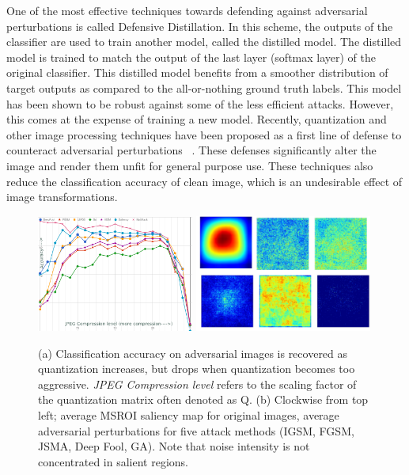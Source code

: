 One of the most effective techniques towards defending against adversarial perturbations is called Defensive Distillation.
In this scheme, the outputs of the classifier are used to train another model, called the distilled model. 
The distilled model is trained to match the output of the last layer (softmax layer) of the original classifier.
This distilled model benefits from a smoother distribution of target outputs as compared to the all-or-nothing ground truth labels.
This model has been shown to be robust against some of the less efficient attacks.
However, this comes at the expense of training a new model.
Recently, quantization and other image processing techniques have been proposed as a first line of defense to counteract adversarial perturbations ~\cite{liang2017detecting,aadityaprakash2018,guo2017countering}. 
These defenses significantly alter the image and render them unfit for general purpose use.
These techniques also reduce the classification accuracy of clean image, which is an undesirable effect of image transformations.

\begin{figure}[H]
    \centering
     \includegraphics[width=0.46\textwidth,angle=0]{figures/protect/jpeg_study.png}
     \includegraphics[width=0.52\textwidth,angle=0]{figures/protect/drawing_noise.jpg}
     \label{fig:jpeg}
     \caption[JPEG under attack]{(a) Classification accuracy on adversarial images is recovered as quantization increases, but drops when quantization becomes too aggressive. \textit{JPEG Compression level} refers to the scaling factor of the quantization matrix often denoted as Q. (b) Clockwise from top left; average MSROI saliency map for original images, average adversarial perturbations for five attack methods (IGSM, FGSM, JSMA, Deep Fool, GA).  Note that noise intensity is not concentrated in salient regions.}
 \end{figure}


